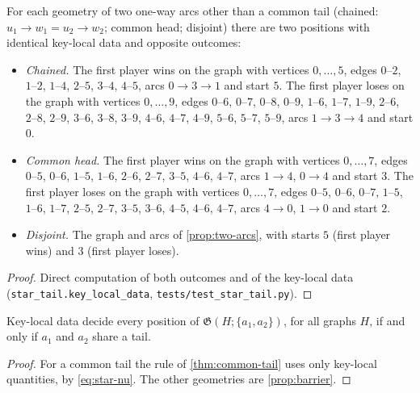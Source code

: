 \documentclass[final]{siamart0516}
\numberwithin{theorem}{section}
\numberwithin{equation}{section}
\theoremstyle{siamnonum}
\theoremstyle{plain}
\newcommand{\code}[1]{{\ttfamily\nolinkurl{#1}}}
\newcommand{\game}{\mathfrak{G}}          %
\begin{document}
\begin{proposition}\label{prop:barrier}
For each geometry of two one-way arcs other than a common tail (chained: $u_1\to w_1=u_2\to w_2$; common head; disjoint) there are two positions with identical key-local data and opposite outcomes:
\begin{itemize}
\item \emph{Chained.} The first player wins on the graph with vertices $0,\dots,5$, edges $0\text{--}2$, $1\text{--}2$, $1\text{--}4$, $2\text{--}5$, $3\text{--}4$, $4\text{--}5$, arcs $0\to3\to1$ and start $5$. The first player loses on the graph with vertices $0,\dots,9$, edges $0\text{--}6$, $0\text{--}7$, $0\text{--}8$, $0\text{--}9$, $1\text{--}6$, $1\text{--}7$, $1\text{--}9$, $2\text{--}6$, $2\text{--}8$, $2\text{--}9$, $3\text{--}6$, $3\text{--}8$, $3\text{--}9$, $4\text{--}6$, $4\text{--}7$, $4\text{--}9$, $5\text{--}6$, $5\text{--}7$, $5\text{--}9$, arcs $1\to3\to4$ and start $0$.
\item \emph{Common head.} The first player wins on the graph with vertices $0,\dots,7$, edges $0\text{--}5$, $0\text{--}6$, $1\text{--}5$, $1\text{--}6$, $2\text{--}6$, $2\text{--}7$, $3\text{--}5$, $4\text{--}6$, $4\text{--}7$, arcs $1\to4$, $0\to4$ and start $3$. The first player loses on the graph with vertices $0,\dots,7$, edges $0\text{--}5$, $0\text{--}6$, $0\text{--}7$, $1\text{--}5$, $1\text{--}6$, $1\text{--}7$, $2\text{--}5$, $2\text{--}7$, $3\text{--}5$, $3\text{--}6$, $4\text{--}5$, $4\text{--}6$, $4\text{--}7$, arcs $4\to0$, $1\to0$ and start $2$.
\item \emph{Disjoint.} The graph and arcs of \cref{prop:two-arcs}, with starts $5$ (first player wins) and $3$ (first player loses).
\end{itemize}
\end{proposition}
\begin{proof}
Direct computation of both outcomes and of the key-local data (\code{star_tail.key_local_data}, \code{tests/test_star_tail.py}).
\end{proof}

\begin{corollary}\label{cor:dichotomy}
Key-local data decide every position of $\game(H;\{a_1,a_2\})$, for all graphs $H$, if and only if $a_1$ and $a_2$ share a tail.
\end{corollary}
\begin{proof}
For a common tail the rule of \cref{thm:common-tail} uses only key-local quantities, by \eqref{eq:star-nu}. The other geometries are \cref{prop:barrier}.
\end{proof}
\end{document}
